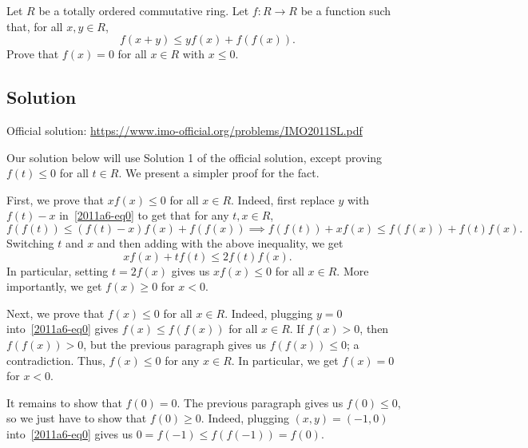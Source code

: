 Let $R$ be a totally ordered commutative ring.
Let $f : R \to R$ be a function such that, for all $x, y \in R$,
\[ f(x + y) \leq y f(x) + f(f(x)). \tag{*}\label{2011a6-eq0} \]
Prove that $f(x) = 0$ for all $x \in R$ with $x \leq 0$.



\subsection*{Solution}

Official solution: \url{https://www.imo-official.org/problems/IMO2011SL.pdf}

Our solution below will use Solution 1 of the official solution, except proving $f(t) \leq 0$ for all $t \in R$.
We present a simpler proof for the fact.

First, we prove that $x f(x) \leq 0$ for all $x \in R$.
Indeed, first replace $y$ with $f(t) - x$ in~\eqref{2011a6-eq0} to get that for any $t, x \in R$,
\[ f(f(t)) \leq (f(t) - x) f(x) + f(f(x)) \implies f(f(t)) + x f(x) \leq f(f(x)) + f(t) f(x). \]
Switching $t$ and $x$ and then adding with the above inequality, we get
\[ x f(x) + t f(t) \leq 2 f(t) f(x). \]
In particular, setting $t = 2 f(x)$ gives us $xf(x) \leq 0$ for all $x \in R$.
More importantly, we get $f(x) \geq 0$ for $x < 0$.

Next, we prove that $f(x) \leq 0$ for all $x \in R$.
Indeed, plugging $y = 0$ into~\eqref{2011a6-eq0} gives $f(x) \leq f(f(x))$ for all $x \in R$.
If $f(x) > 0$, then $f(f(x)) > 0$, but the previous paragraph gives us $f(f(x)) \leq 0$; a contradiction.
Thus, $f(x) \leq 0$ for any $x \in R$.
In particular, we get $f(x) = 0$ for $x < 0$.

It remains to show that $f(0) = 0$.
The previous paragraph gives us $f(0) \leq 0$, so we just have to show that $f(0) \geq 0$.
Indeed, plugging $(x, y) = (-1, 0)$ into~\eqref{2011a6-eq0} gives us $0 = f(-1) \leq f(f(-1)) = f(0)$.
